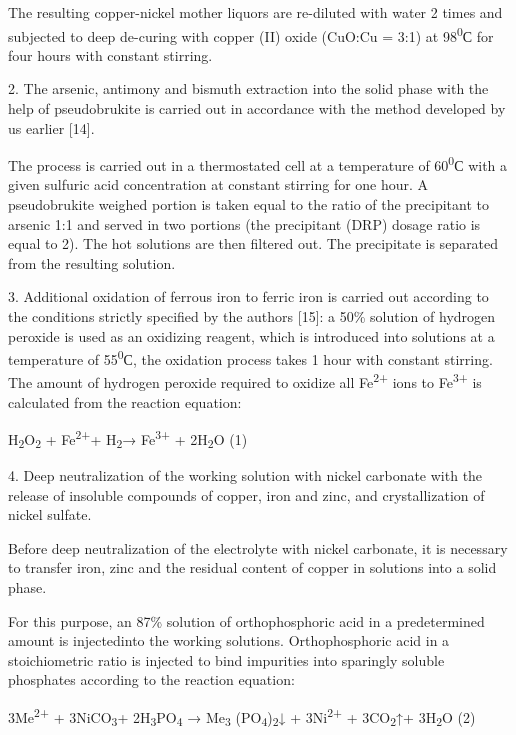 The resulting copper-nickel mother liquors are re-diluted with water 2
times and subjected to deep de-curing with copper (II) oxide (CuO:Cu =
3:1) at 98\textsuperscript{0}С for four hours with constant stirring.

2. The arsenic, antimony and bismuth extraction into the solid phase
with the help of pseudobrukite is carried out in accordance with the
method developed by us earlier {[}14{]}.

The process is carried out in a thermostated cell at a temperature of
60\textsuperscript{0}С with a given sulfuric acid concentration at
constant stirring for one hour. A pseudobrukite weighed portion is taken
equal to the ratio of the precipitant to arsenic 1:1 and served in two
portions (the precipitant (DRP) dosage ratio is equal to 2). The hot
solutions are then filtered out. The precipitate is separated from the
resulting solution.

3. Additional oxidation of ferrous iron to ferric iron is carried out
according to the conditions strictly specified by the authors {[}15{]}:
a 50\% solution of hydrogen peroxide is used as an oxidizing reagent,
which is introduced into solutions at a temperature of
55\textsuperscript{0}С, the oxidation process takes 1 hour with constant
stirring. The amount of hydrogen peroxide required to oxidize all
Fe\textsuperscript{2+} ions to Fe\textsuperscript{3+} is calculated from
the reaction equation:

H\textsubscript{2}O\textsubscript{2} + Fe\textsuperscript{2+}+
H\textsubscript{2}→ Fe\textsuperscript{3+} + 2H\textsubscript{2}O (1)

4. Deep neutralization of the working solution with nickel carbonate
with the release of insoluble compounds of copper, iron and zinc, and
crystallization of nickel sulfate.

Before deep neutralization of the electrolyte with nickel carbonate, it
is necessary to transfer iron, zinc and the residual content of copper
in solutions into a solid phase.

For this purpose, an 87\% solution of orthophosphoric acid in a
predetermined amount is injectedinto the working solutions.
Orthophosphoric acid in a stoichiometric ratio is injected to bind
impurities into sparingly soluble phosphates according to the reaction
equation:

3Me\textsuperscript{2+} + 3NiCO\textsubscript{3}+
2H\textsubscript{3}PO\textsubscript{4} → Me\textsubscript{3}
(PO\textsubscript{4})\textsubscript{2}↓ + 3Ni\textsuperscript{2+} +
3CO\textsubscript{2}↑+ 3H\textsubscript{2}O (2)

